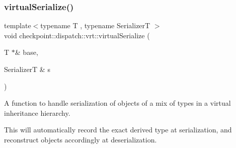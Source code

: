 \subsubsection{\texorpdfstring{virtual\+Serialize()}{virtualSerialize()}}
{\footnotesize\ttfamily template$<$typename T , typename SerializerT $>$ \\
void checkpoint\+::dispatch\+::vrt\+::virtual\+Serialize (\begin{DoxyParamCaption}\item[{T $\ast$\&}]{base,  }\item[{SerializerT \&}]{s }\end{DoxyParamCaption})}



A function to handle serialization of objects of a mix of types in a virtual inheritance hierarchy. 

This will automatically record the exact derived type at serialization, and reconstruct objects accordingly at deserialization. 
